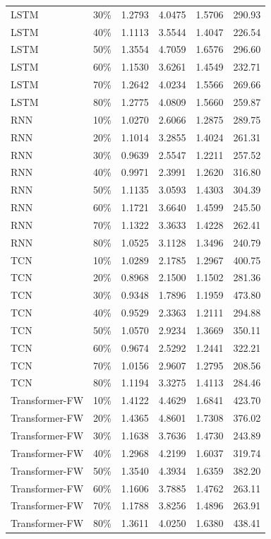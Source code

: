 \begin{longtable}{l c c c c c}
        LSTM & 30\% & 1.2793 & 4.0475 & 1.5706 & 290.93 \\
        LSTM & 40\% & 1.1113 & 3.5544 & 1.4047 & 226.54 \\
        LSTM & 50\% & 1.3554 & 4.7059 & 1.6576 & 296.60 \\
        LSTM & 60\% & 1.1530 & 3.6261 & 1.4549 & 232.71 \\
        LSTM & 70\% & 1.2642 & 4.0234 & 1.5566 & 269.66 \\
        LSTM & 80\% & 1.2775 & 4.0809 & 1.5660 & 259.87 \\
        RNN & 10\% & 1.0270 & 2.6066 & 1.2875 & 289.75 \\
        RNN & 20\% & 1.1014 & 3.2855 & 1.4024 & 261.31 \\
        RNN & 30\% & 0.9639 & 2.5547 & 1.2211 & 257.52 \\
        RNN & 40\% & 0.9971 & 2.3991 & 1.2620 & 316.80 \\
        RNN & 50\% & 1.1135 & 3.0593 & 1.4303 & 304.39 \\
        RNN & 60\% & 1.1721 & 3.6640 & 1.4599 & 245.50 \\
        RNN & 70\% & 1.1322 & 3.3633 & 1.4228 & 262.41 \\
        RNN & 80\% & 1.0525 & 3.1128 & 1.3496 & 240.79 \\
        TCN & 10\% & 1.0289 & 2.1785 & 1.2967 & 400.75 \\
        TCN & 20\% & 0.8968 & 2.1500 & 1.1502 & 281.36 \\
        TCN & 30\% & 0.9348 & 1.7896 & 1.1959 & 473.80 \\
        TCN & 40\% & 0.9529 & 2.3363 & 1.2111 & 294.88 \\
        TCN & 50\% & 1.0570 & 2.9234 & 1.3669 & 350.11 \\
        TCN & 60\% & 0.9674 & 2.5292 & 1.2441 & 322.21 \\
        TCN & 70\% & 1.0156 & 2.9607 & 1.2795 & 208.56 \\
        TCN & 80\% & 1.1194 & 3.3275 & 1.4113 & 284.46 \\
        Transformer-FW & 10\% & 1.4122 & 4.4629 & 1.6841 & 423.70 \\
        Transformer-FW & 20\% & 1.4365 & 4.8601 & 1.7308 & 376.02 \\
        Transformer-FW & 30\% & 1.1638 & 3.7636 & 1.4730 & 243.89 \\
        Transformer-FW & 40\% & 1.2968 & 4.2199 & 1.6037 & 319.74 \\
        Transformer-FW & 50\% & 1.3540 & 4.3934 & 1.6359 & 382.20 \\
        Transformer-FW & 60\% & 1.1606 & 3.7885 & 1.4762 & 263.11 \\
        Transformer-FW & 70\% & 1.1788 & 3.8256 & 1.4896 & 263.91 \\
        Transformer-FW & 80\% & 1.3611 & 4.0250 & 1.6380 & 438.41 \\

\end{longtable}
